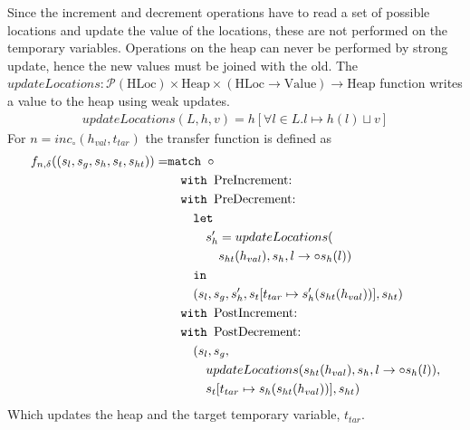 Since the increment and decrement operations have to read a set of possible locations and update the value of the locations, these are not performed on the temporary variables. Operations on the heap can never be performed by strong update, hence the new values must be joined with the old. The $updateLocations:\mathcal{P}(\text{HLoc}) \times \text{Heap} \times (\text{HLoc}\rightarrow\text{Value})\rightarrow \text{Heap}$ function writes a value to the heap using weak updates.
\begin{align}
updateLocations(L,h, v) = h[\forall l \in L. l \mapsto h(l)\sqcup v]
\end{align}
For $n = \mathit{inc}_\circ(h_{val},t_{tar})$ the transfer function is defined as
\begin{align}
f_{n,\delta}((s_l, s_g, s_h, s_t, s_{ht})) =     & \texttt{match }\circ\notag\\
                                & \quad\texttt{with }\text{PreIncrement}\text{: } \notag\\
                                & \quad\texttt{with }\text{PreDecrement}\text{: } \notag\\
                                & \quad\quad\texttt{let } \notag\\
                                & \quad\quad\quad s_h' = updateLocations(\notag\\
                                & \quad\quad\quad\quad s_{ht}(h_{val}), s_h, l\rightarrow \circ s_h(l))\notag\\
                                & \quad\quad  \texttt{in }\notag\\
                                & \quad\quad (s_l, s_g, s_h',s_t[t_{tar}\mapsto s_h'(s_{ht}(h_{val}))], s_{ht})\notag\\
                                & \quad\texttt{with }\text{PostIncrement}\text{: } \notag\\
                                & \quad\texttt{with }\text{PostDecrement}\text{: } \notag\\
                                & \quad\quad (s_l, s_g, \notag\\
                                & \quad\quad\quad updateLocations(s_{ht}(h_{val}), s_h, l\rightarrow \circ s_h(l)),\notag\\
                                & \quad\quad\quad s_t[t_{tar}\mapsto s_h(s_{ht}(h_{val}))], s_{ht})
\end{align}
Which updates the heap and the target temporary variable, $t_{tar}$.
